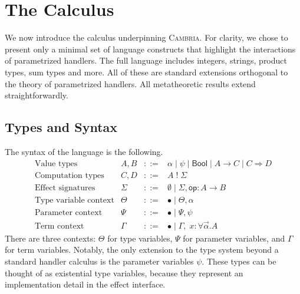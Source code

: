 \documentclass[acmsmall,screen,review,anonymous]{acmart}
\newcommand{\cambria}{\textsc{Cambria}}
\newcommand{\tbool}{\mathsf{Bool}}
\newcommand{\tfun}[2]{#1 \to #2}
\newcommand{\thandler}[2]{#1 \Rightarrow #2}
\newcommand{\comp}[2]{#1\;!\;#2}
\newcommand{\op}{\mathsf{op}}
\newcommand{\G}{\Gamma}
\newcommand{\Sig}{\Sigma}
\newcommand{\eenv}{\bullet}
\begin{document}
\section{The Calculus}\label{sec:calculus}

We now introduce the calculus underpinning \cambria{}.
For clarity, we chose to present only a minimal set of language constructs that highlight the interactions of parametrized handlers.
The full language includes integers, strings, product types, sum types and more.
All of these are standard extensions orthogonal to the theory of parametrized handlers.
All metatheoretic results extend straightforwardly.

\subsection{Types and Syntax}

The syntax of the language is the following.
\[
\begin{array}{lrcl}
  \text{Value types}           & A, B   & ::= & \alpha \mid \psi \mid \tbool \mid \tfun{A}{C} \mid \thandler{C}{D} \\[4pt]
  \text{Computation types}     & C, D   & ::= & \comp{A}{\Sig} \\[4pt]
  \text{Effect signatures}     & \Sig   & ::= & \emptyset \mid \Sig, \op : A \to B \\[4pt]
  \text{Type variable context} & \Theta & ::= & \eenv \mid \Theta, \alpha \\[4pt]
  \text{Parameter context}     & \Psi   & ::= & \eenv \mid \Psi, \psi \\[4pt]
  \text{Term context}          & \G     & ::= & \eenv \mid \G,\; x : \forall \vec{\alpha} . A
\end{array}
\]
There are three contexts: $\Theta$ for type variables, $\Psi$ for parameter variables, and $\Gamma$ for term variables.
Notably, the only extension to the type system beyond a standard handler calculus is the parameter variables $\psi$.
These types can be thought of as existential type variables, because they represent an implementation detail in the effect interface.
\end{document}

